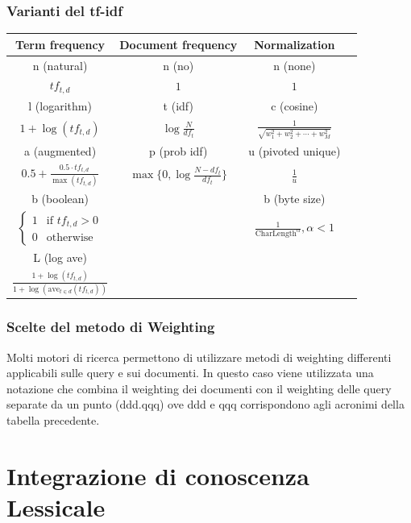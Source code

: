 \documentclass{report}
\begin{document}
	\subsection{Varianti del tf-idf}
	\begin{table}[H]
		\centering
		\renewcommand{\arraystretch}{1.5}
		\begin{tabular}{|c|c|c|c|}
		\hline
		\textbf{Term frequency} & \textbf{Document frequency} & \textbf{Normalization} \\
		\hline
		{n (natural)} & {n (no)} & {n (none)} \\
		$tf_{t,d}$ & $1$ & $1$ \\
		\hline
		{l (logarithm)} & {t (idf)} & {c (cosine)} \\
		$1 + \log(tf_{t,d})$ & $\log \frac{N}{df_t}$ & $\frac{1}{\sqrt{w_1^2 + w_2^2 + \cdots + w_M^2}}$ \\
		\hline
		a (augmented) & p (prob idf) & u (pivoted unique) \\
		$0.5 + \frac{0.5 \cdot tf_{t,d}}{\max(tf_{t,d})}$ & $\max \{0, \log \frac{N - df_t}{df_t} \}$ & $\frac{1}{u}$ \\
		\hline
		b (boolean) & & b (byte size) \\
		$\begin{cases} 1 & \text{if } tf_{t,d} > 0 \\ 0 & \text{otherwise} \end{cases}$ & & $\frac{1}{\text{CharLength}^\alpha}, \alpha < 1$ \\
		\hline
		L (log ave) & & \\
		$\frac{1 + \log(tf_{t,d})}{1 + \log(\text{ave}_{t \in d}(tf_{t,d}))}$ & & \\
		\hline
		\end{tabular}
	\end{table}

	\subsection{Scelte del metodo di Weighting}
	Molti motori di ricerca permettono di utilizzare metodi di weighting differenti applicabili sulle query e sui documenti. In questo caso viene utilizzata una notazione che combina il weighting dei documenti con il weighting delle query separate da un punto (ddd.qqq) ove ddd e qqq corrispondono agli acronimi della tabella precedente.
	
	\chapter{Integrazione di conoscenza Lessicale}
\end{document}
